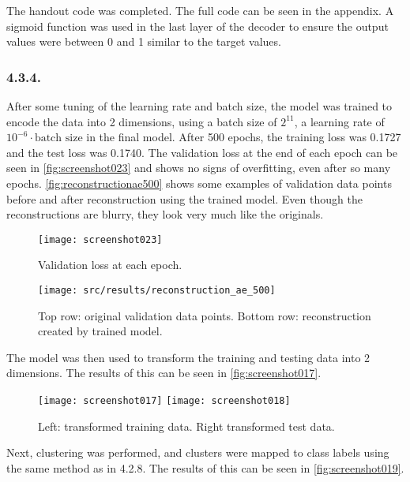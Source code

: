 \documentclass[a4paper, 12pt]{article}
\begin{document}
The handout code was completed. The full code can be seen in the appendix. A sigmoid function was used in the last layer of the decoder to ensure the output values were between 0 and 1 similar to the target values.

\subsubsection{4.3.4.}

After some tuning of the learning rate and batch size, the model was trained to encode the data into 2 dimensions, using a batch size of $2^{11}$, a learning rate of $10^{-6} \cdot \text{batch size}$ in the final model. After 500 epochs, the training loss was 0.1727 and the test loss was 0.1740.
The validation loss at the end of each epoch can be seen in \autoref{fig:screenshot023} and shows no signs of overfitting, even after so many epochs. \autoref{fig:reconstructionae500} shows some examples of validation data points before and after reconstruction using the trained model. Even though the reconstructions are blurry, they look very much like the originals.

\begin{figure}[H]
	\centering
	\texttt{[image: screenshot023]}
	\caption{Validation loss at each epoch.}
	\label{fig:screenshot023}
\end{figure}

\begin{figure}[H]
	\centering
	\texttt{[image: src/results/reconstruction\_ae\_500]}
	\caption{Top row: original validation data points. Bottom row: reconstruction created by trained model.}
	\label{fig:reconstructionae500}
\end{figure}


The model was then used to transform the training and testing data into 2 dimensions. The results of this can be seen in \autoref{fig:screenshot017}.

\begin{figure}[H]
	\centering
	\texttt{[image: screenshot017]}
	\texttt{[image: screenshot018]}
	\caption{Left: transformed training data. Right transformed test data.}
	\label{fig:screenshot017}
\end{figure}

Next, clustering was performed, and clusters were mapped to class labels using the same method as in 4.2.8. The results of this can be seen in \autoref{fig:screenshot019}.
\end{document}

